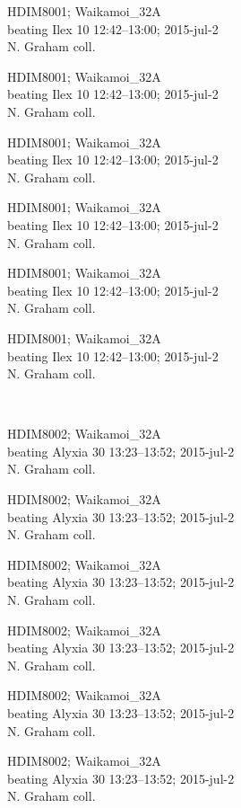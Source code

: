 \documentclass[2pt]{extarticle}
\begin{document}
\noindent
\parbox{0.16\textwidth}{\tiny \raggedright \rule[-0.3\baselineskip]{0pt}{10pt}HDIM8001; Waikamoi\_32A\\ beating Ilex 10 12:42--13:00; 2015-jul-2\\ N. Graham coll.}
\parbox{0.16\textwidth}{\tiny \raggedright \rule[-0.3\baselineskip]{0pt}{10pt}HDIM8001; Waikamoi\_32A\\ beating Ilex 10 12:42--13:00; 2015-jul-2\\ N. Graham coll.}
\parbox{0.16\textwidth}{\tiny \raggedright \rule[-0.3\baselineskip]{0pt}{10pt}HDIM8001; Waikamoi\_32A\\ beating Ilex 10 12:42--13:00; 2015-jul-2\\ N. Graham coll.}
\parbox{0.16\textwidth}{\tiny \raggedright \rule[-0.3\baselineskip]{0pt}{10pt}HDIM8001; Waikamoi\_32A\\ beating Ilex 10 12:42--13:00; 2015-jul-2\\ N. Graham coll.}
\parbox{0.16\textwidth}{\tiny \raggedright \rule[-0.3\baselineskip]{0pt}{10pt}HDIM8001; Waikamoi\_32A\\ beating Ilex 10 12:42--13:00; 2015-jul-2\\ N. Graham coll.}
\parbox{0.16\textwidth}{\tiny \raggedright \rule[-0.3\baselineskip]{0pt}{10pt}HDIM8001; Waikamoi\_32A\\ beating Ilex 10 12:42--13:00; 2015-jul-2\\ N. Graham coll.} \\ 
\vspace{0.001in} 

\noindent
\parbox{0.16\textwidth}{\tiny \raggedright \rule[-0.3\baselineskip]{0pt}{10pt}HDIM8002; Waikamoi\_32A\\ beating Alyxia 30 13:23--13:52; 2015-jul-2\\ N. Graham coll.}
\parbox{0.16\textwidth}{\tiny \raggedright \rule[-0.3\baselineskip]{0pt}{10pt}HDIM8002; Waikamoi\_32A\\ beating Alyxia 30 13:23--13:52; 2015-jul-2\\ N. Graham coll.}
\parbox{0.16\textwidth}{\tiny \raggedright \rule[-0.3\baselineskip]{0pt}{10pt}HDIM8002; Waikamoi\_32A\\ beating Alyxia 30 13:23--13:52; 2015-jul-2\\ N. Graham coll.}
\parbox{0.16\textwidth}{\tiny \raggedright \rule[-0.3\baselineskip]{0pt}{10pt}HDIM8002; Waikamoi\_32A\\ beating Alyxia 30 13:23--13:52; 2015-jul-2\\ N. Graham coll.}
\parbox{0.16\textwidth}{\tiny \raggedright \rule[-0.3\baselineskip]{0pt}{10pt}HDIM8002; Waikamoi\_32A\\ beating Alyxia 30 13:23--13:52; 2015-jul-2\\ N. Graham coll.}
\parbox{0.16\textwidth}{\tiny \raggedright \rule[-0.3\baselineskip]{0pt}{10pt}HDIM8002; Waikamoi\_32A\\ beating Alyxia 30 13:23--13:52; 2015-jul-2\\ N. Graham coll.} \\ 
\vspace{0.001in} 
\end{document}
